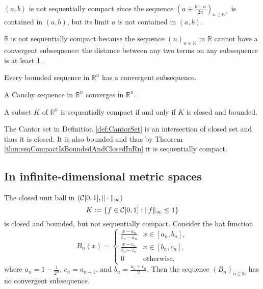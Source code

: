 \begin{exm}
  $(a,b)$ is not sequentially compact
  since the sequence
  $\left(a+\frac{b-a}{2n}\right)_{n\in \mathbb{N}^+}$
  is contained in $(a,b)$,
  but its limit $a$ is not contained in $(a,b)$.
\end{exm}

\begin{exm}
  $\mathbb{R}$ is not sequentially compact
  because the sequence $(n)_{n\in\mathbb{N}}$ in $\mathbb{R}$
  cannot have a convergent subsequence: 
  the distance between any two terms on any subsequence is at least 1.
\end{exm}

\begin{lem}
  \label{lem:boundedSeqInRnHasConvergentSubseq}
  Every bounded sequence in $\mathbb{R}^n$
  has a convergent subsequence.
\end{lem}

\begin{lem}
  \label{lem:CauchySeqConvergesInRn}
  A Cauchy sequence in $\mathbb{R}^n$ converges in $\mathbb{R}^n$.
\end{lem}

\begin{thm}
  \label{thm:seqCompactIsBoundedAndClosedInRn}
  A subset $K$ of $\mathbb{R}^n$ is sequentially compact
  if and only if $K$ is closed and bounded.
\end{thm}

\begin{exm}
  The Cantor set in Definition \ref{def:CantorSet}
  is an intersection of closed set
  and thus it is closed.
  It is also bounded and thus
  by Theorem \ref{thm:seqCompactIsBoundedAndClosedInRn}
  it is sequentially compact.
\end{exm}


\subsection{In infinite-dimensional metric spaces}


\begin{exm}
  \label{exm:closedBallInC01}
  The closed unit ball in $({\cal C}[0,1], \|\cdot\|_{\infty})$
  \begin{equation}
    \label{eq:closedBallInC01}
    K:= \left\{f\in {\cal C}[0,1] :
      \|f\|_{\infty} \le 1 \right\}
  \end{equation}
  is closed and bounded,
  but not sequentially compact.
  Consider the hat function
  \begin{equation}
    \label{eq:hatFuncInt}
    B_n(x) = 
    \begin{cases}
      \frac{x-a_n}{b_n-a_n} & x\in [a_n, b_n],
      \\
      \frac{x-c_n}{b_n-c_n} & x\in [b_n, c_n],
      \\
      0 & \text{otherwise},
    \end{cases}
  \end{equation}
  where $a_n=1-\frac{1}{2^n}$, $c_n=a_{n+1}$,
  and $b_n=\frac{a_n+c_n}{2}$.
  Then the sequence $(B_n)_{n\in \mathbb{N}}$
  has no convergent subsequence.
\end{exm}

